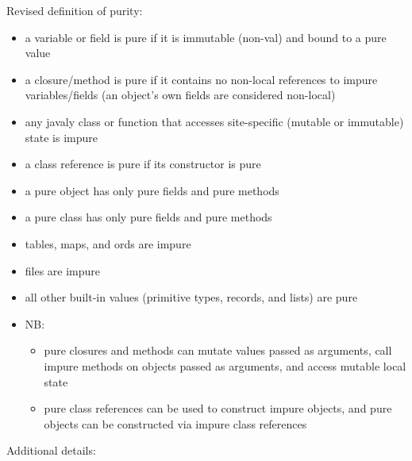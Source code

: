 Revised definition of purity:
\begin{itemize}\renewcommand{\labelitemi}{--}

\item a variable or field is pure if it is immutable (non-val) and bound to a pure value
\item a closure/method is pure if it contains no non-local references to impure variables/fields (an object's own fields are considered non-local)
\item any javaly class or function that accesses site-specific (mutable or immutable) state is impure 
\item a class reference is pure if its constructor is pure 
\item a pure object has only pure fields and pure methods 
\item a pure class has only pure fields and pure methods 
\item tables, maps, and ords are impure
\item files are impure
\item all other built-in values (primitive types, records, and lists) are pure

\item NB: 
  \begin{itemize}
  \item pure closures and methods can mutate values passed as arguments, call impure methods on objects passed as arguments, and 
    access mutable local state 
  \item pure class references can be used to construct impure objects, and pure objects can be constructed via impure class references  
  \end{itemize}
\end{itemize}
Additional details:

